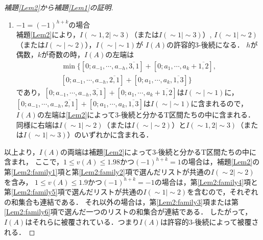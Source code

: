\documentclass[10pt,a4paper]{ujarticle}
\theoremstyle{definition}
\begin{document}
\begin{proof}[補題\ref{Lem2}から補題\ref{Lem1}の証明]
\begin{enumerate}
  \item $-1= (-1)^{h + k}$の場合\\
  補題\ref{Lem2}により，$I(\sim 1, 2| \sim 3)$（または$I(\sim 1| \sim 3)$）, $I(\sim 1| \sim 2)$（または$I(\sim| \sim 2)$），$I(\sim| \sim 1)$が
  $I(A)$の許容的$3$-後続になる．
  $h$が偶数，$k$が奇数の時，$I(A)$の左端は
  \begin{align*}
    \min \{[0; a_{-1},\cdots , a_{-h}, \overline{3, 1}] + [0; a_1,\cdots , a_{k} + \overline{1, 2}],\\
    [0; a_{-1},\cdots , a_{-h}, \overline{2, 1}] + [0; a_1,\cdots , a_{k}, \overline{1, 3}] \}
  \end{align*}
  であり，$[0; a_{-1},\cdots , a_{-h}, \overline{3, 1}] + [0; a_1,\cdots , a_{k} + \overline{1, 2}]$は$I(\sim| \sim 1)$に，
  $[0; a_{-1},\cdots , a_{-h}, \overline{2, 1}] + [0; a_1,\cdots , a_{k}, \overline{1, 3}]$は$I(\sim| \sim 1)$に含まれるので，
  $I(A)$の左端は\ref{Lem2}によって$3$-後続と分かるT区間たちの中に含まれる．
  同様に右端は$I(\sim 1| \sim 2)$（または$I(\sim| \sim 2)$）と$I(\sim 1, 2| \sim 3)$（または$I(\sim 1| \sim 3)$）のいずれかに含まれる．
 \end{enumerate}
  以上より，$I(A)$の両端は補題\ref{Lem2}によって$3$-後続と分かるT区間たちの中に含まれ，
  ここで，$1\le v(A)\le1.98$かつ$(-1)^{h+k}=1$の場合は，補題\ref{Lem2}の第\ref{Lem2:family1}項と第\ref{Lem2:family2}項で選んだリストが共通の$I(\sim 2|\sim 2)$を含み，
  $1\le v(A)\le1.9$かつ$(-1)^{h+k}=-1$の場合は，第\ref{Lem2:family4}項と第\ref{Lem2:family5}項で選んだリストが共通の$I(\sim 1|\sim 2)$を含むので，それぞれの和集合も連結である．
  それ以外の場合は，第\ref{Lem2:family3}項または第\ref{Lem2:family6}項で選んだ一つのリストの和集合が連結である．
  したがって，$I(A)$はそれらに被覆されている．つまり$I(A)$は許容的$3$-後続によって被覆される．
\end{proof}
\end{document}
